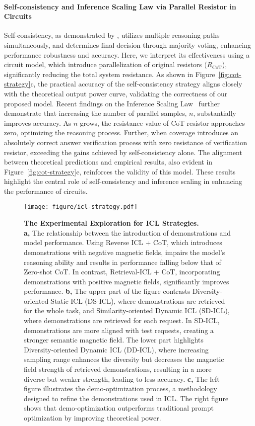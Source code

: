 \paragraph{Self-consistency and Inference Scaling Law via Parallel Resistor in Circuits}
Self-consistency, as demonstrated by \citet{wang2023selfconsistency}, utilizes multiple reasoning paths simultaneously, and determines final decision through majority voting, enhancing performance robustness and accuracy. Here, we interpret its effectiveness using a circuit model, which introduce parallelization of original resistors ($R_{\text{CoT}}$), significantly reducing the total system resistance. As shown in Figure~\ref{fig:cot-strategy}c, the practical accuracy of the self-consistency strategy aligns closely with the theoretical output power curve, validating the correctness of our proposed model.
Recent findings on the Inference Scaling Law~\cite{wu2024inference,openai2024o1} further demonstrate that increasing the number of parallel samples, $n$, substantially improves accuracy. As $n$ grows, the resistance value of CoT resistor approaches zero, optimizing the reasoning process. Further, when coverage introduces an absolutely correct answer verification process with zero resistance of verification resistor, exceeding the gains achieved by self-consistency alone. The alignment between theoretical predictions and empirical results, also evident in Figure~\ref{fig:cot-strategy}c, reinforces the validity of this model. These results highlight the central role of self-consistency and inference scaling in enhancing the performance of circuits.

\begin{figure}[t]
    \centering
    \texttt{[image: figure/icl-strategy.pdf]}
    \caption{
        \textbf{The Experimental Exploration for ICL Strategies.}\\
        \textbf{a,}
        The relationship between the introduction of demonstrations and model performance. Using Reverse ICL + CoT, which introduces demonstrations with negative magnetic fields, impairs the model’s reasoning ability and results in performance falling below that of Zero-shot CoT. In contrast, Retrieval-ICL + CoT, incorporating demonstrations with positive magnetic fields, significantly improves performance.
        \textbf{b,}
        The upper part of the figure contrasts Diversity-oriented Static ICL (DS-ICL), where demonstrations are retrieved for the whole task, and Similarity-oriented Dynamic ICL (SD-ICL), where demonstrations are retrieved for each request. In SD-ICL, demonstrations are more aligned with test requests, creating a stronger semantic magnetic field.
        The lower part highlights Diversity-oriented Dynamic ICL (DD-ICL), where increasing sampling range enhances the diversity but decreases the magnetic field strength of retrieved demonstrations, resulting in a more diverse but weaker strength, leading to less accuracy.
        \textbf{c,}
        The left figure illustrates the demo-optimization process, a methodology designed to refine the demonstrations used in ICL. The right figure shows that demo-optimization outperforms traditional prompt optimization by improving theoretical power.
    }
    \label{fig:icl-strategy}
\end{figure}
